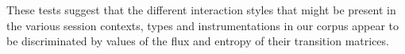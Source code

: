 \documentclass{sigchi}
\begin{document}
These tests suggest that the different interaction styles that might be
present in the various session contexts, types and instrumentations in our corpus
appear to be discriminated  by values of the flux and entropy of their transition
matrices.

\end{document}
